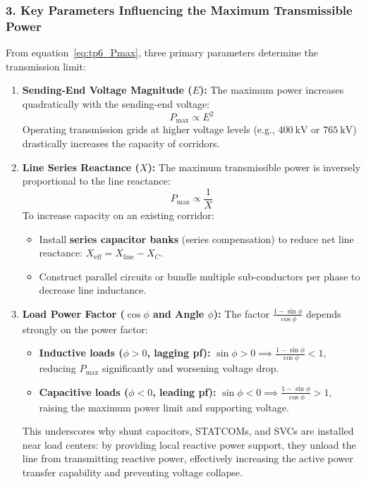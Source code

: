 \subsubsection*{3. Key Parameters Influencing the Maximum Transmissible Power}
From equation~\eqref{eq:tp6_Pmax}, three primary parameters determine the transmission limit:
\begin{enumerate}
    \item \textbf{Sending-End Voltage Magnitude ($E$):}
    The maximum power increases quadratically with the sending-end voltage:
    \[
    P_{\text{max}} \propto E^2
    \]
    Operating transmission grids at higher voltage levels (e.g., $400\ \text{kV}$ or $765\ \text{kV}$) drastically increases the capacity of corridors.

    \item \textbf{Line Series Reactance ($X$):}
    The maximum transmissible power is inversely proportional to the line reactance:
    \[
    P_{\text{max}} \propto \frac{1}{X}
    \]
    To increase capacity on an existing corridor:
    \begin{itemize}
        \item Install \textbf{series capacitor banks} (series compensation) to reduce net line reactance: $X_{\text{eff}} = X_{\text{line}} - X_C$.
        \item Construct parallel circuits or bundle multiple sub-conductors per phase to decrease line inductance.
    \end{itemize}

    \item \textbf{Load Power Factor ($\cos\phi$ and Angle $\phi$):}
    The factor $\frac{1 - \sin\phi}{\cos\phi}$ depends strongly on the power factor:
    \begin{itemize}
        \item \textbf{Inductive loads ($\phi > 0$, lagging pf):} $\sin\phi > 0 \implies \frac{1 - \sin\phi}{\cos\phi} < 1$, reducing $P_{\text{max}}$ significantly and worsening voltage drop.
        \item \textbf{Capacitive loads ($\phi < 0$, leading pf):} $\sin\phi < 0 \implies \frac{1 - \sin\phi}{\cos\phi} > 1$, raising the maximum power limit and supporting voltage.
    \end{itemize}
    This underscores why shunt capacitors, STATCOMs, and SVCs are installed near load centers: by providing local reactive power support, they unload the line from transmitting reactive power, effectively increasing the active power transfer capability and preventing voltage collapse.
\end{enumerate}
